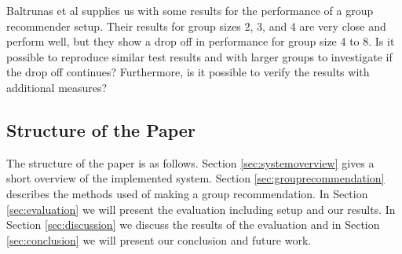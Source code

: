 
Baltrunas et al supplies us with some results for the performance of a group recommender setup. Their results for group sizes 2, 3, and 4 are very close and perform well, but they show a drop off in performance for group size 4 to 8. Is it possible to reproduce similar test results and with larger groups to investigate if the drop off continues? Furthermore, is it possible to verify the results with additional measures?


\subsection{Structure of the Paper}
The structure of the paper is as follows. Section \ref{sec:systemoverview} gives a short overview of the implemented system. Section \ref{sec:grouprecommendation} describes the methods used of making a group recommendation. In Section \ref{sec:evaluation} we will present the evaluation including setup and our results. In Section \ref{sec:discussion} we discuss the results of the evaluation and in Section \ref{sec:conclusion} we will present our conclusion and future work.